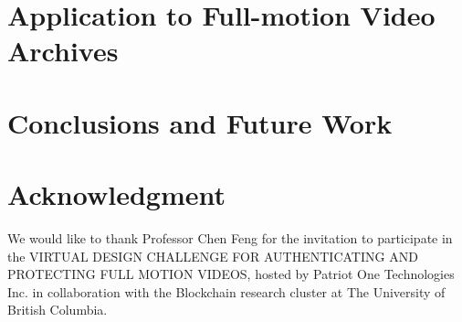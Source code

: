\documentclass[conference]{IEEEtran}
\begin{document}
\section{Application to Full-motion Video Archives}
\section{Conclusions and Future Work}
\section*{Acknowledgment}
We would like to thank Professor Chen Feng for the invitation to participate in the VIRTUAL DESIGN CHALLENGE FOR AUTHENTICATING  AND  PROTECTING  FULL  MOTION  VIDEOS, hosted by Patriot One Technologies Inc. in collaboration with the Blockchain research cluster at The University of British Columbia.
{}

\end{document}
